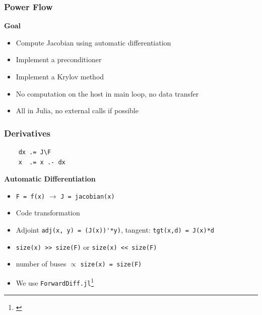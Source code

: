 \begin{frame}
  \frametitle{Power Flow}
  {\bf Goal}
  \begin{itemize}
    \item Compute Jacobian using automatic differentiation
    \item Implement a preconditioner
    \item Implement a Krylov method
    \item No computation on the host in main loop, no data transfer
    \item All in Julia, no external calls if possible
  \end{itemize}
\end{frame}

\begin{frame}[fragile]
  \frametitle{Derivatives}
  \begin{center}
  \lstset{linewidth = \textwidth, frame=tb}
  \begin{minipage}{.3\textwidth}
    \begin{lstlisting}
    dx .= J\F
    x  .= x .- dx
    \end{lstlisting}
   \end{minipage}
  \end{center}
  \lstset{linewidth = \textwidth}
  {\bf Automatic Differentiation}
  \begin{itemize}
    \item \lstinline{F = f(x)} $\rightarrow$ \lstinline{J = jacobian(x)}
    \item Code transformation
    \item Adjoint \lstinline{adj(x, y) = (J(x))'*y)}, tangent: \lstinline{tgt(x,d) = J(x)*d} 
    \item \lstinline{size(x) >> size(F)} or \lstinline{size(x) << size(F)}
    \item number of buses $\propto$ \lstinline{size(x) = size(F)}
    \item We use \lstinline{ForwardDiff.jl}\footnote{\cite{RevelsLubinPapamarkou2016}}
  \end{itemize}
\end{frame}

